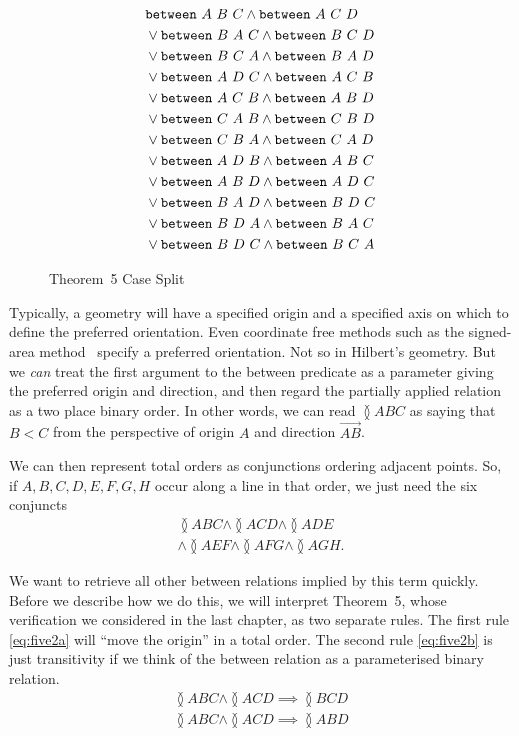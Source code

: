 \begin{figure}
  \begin{align*}
    &\texttt{between}\ A\ B\ C\wedge\texttt{between}\ A\ C\ D\\
    &\vee\texttt{between}\ B\ A\ C\wedge\texttt{between}\ B\ C\ D\\
    &\vee\texttt{between}\ B\ C\ A\wedge\texttt{between}\ B\ A\ D\\
    &\vee\texttt{between}\ A\ D\ C\wedge\texttt{between}\ A\ C\ B\\
    &\vee\texttt{between}\ A\ C\ B\wedge\texttt{between}\ A\ B\ D\\
    &\vee\texttt{between}\ C\ A\ B\wedge\texttt{between}\ C\ B\ D\\
    &\vee\texttt{between}\ C\ B\ A\wedge\texttt{between}\ C\ A\ D\\
    &\vee\texttt{between}\ A\ D\ B\wedge\texttt{between}\ A\ B\ C\\
    &\vee\texttt{between}\ A\ B\ D\wedge\texttt{between}\ A\ D\ C\\
    &\vee\texttt{between}\ B\ A\ D\wedge\texttt{between}\ B\ D\ C\\
    &\vee\texttt{between}\ B\ D\ A\wedge\texttt{between}\ B\ A\ C\\
    &\vee\texttt{between}\ B\ D\ C\wedge\texttt{between}\ B\ C\ A
  \end{align*}
\caption{Theorem~5 Case Split}
\label{fig:Theorem5CasesFormalised}
\end{figure}

Typically, a geometry will have a specified origin and a specified axis on which to define the preferred orientation. Even coordinate free methods such as the signed-area method~\cite{SignedAreaMethod} specify a preferred orientation. Not so in Hilbert's geometry. But we \emph{can} treat the first argument to the between predicate as a parameter giving the preferred origin and direction, and then regard the partially applied relation as a two place binary order. In other words, we can read $\between{A}{B}{C}$ as saying that $B<C$ from the perspective of origin $A$ and direction $\overrightarrow{AB}$.

We can then represent total orders as conjunctions ordering adjacent points. So, if $A,B,C,D,E,F,G,H$ occur along a line in that order, we just need the six conjuncts
\begin{multline}\label{theorem:OrderRepExample}
\between{A}{B}{C} \wedge \between{A}{C}{D} \wedge \between{A}{D}{E}\\
\wedge\between{A}{E}{F}\wedge\between{A}{F}{G}\wedge\between{A}{G}{H}.
\end{multline}

We want to retrieve all other between relations implied by this term quickly. Before we describe how we do this, we will interpret Theorem~5, whose verification we considered in the last chapter, as two separate rules. The first rule \eqref{eq:five2a} will ``move the origin'' in a total order. The second rule \eqref{eq:five2b} is just transitivity if we think of the between relation as a parameterised binary relation.
\begin{gather}
\label{eq:five2a}\between{A}{B}{C} \wedge \between{A}{C}{D} \implies \between{B}{C}{D}\\
\label{eq:five2b}\between{A}{B}{C} \wedge \between{A}{C}{D} \implies \between{A}{B}{D}
\end{gather}

